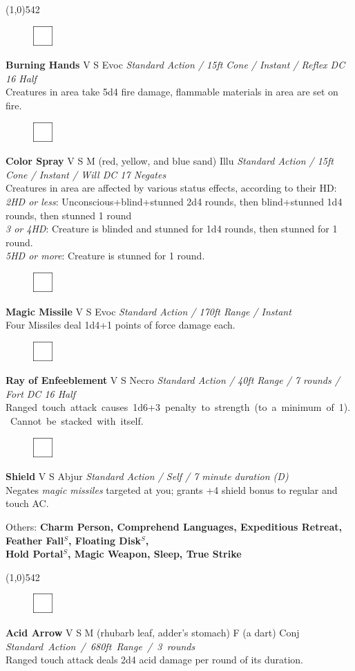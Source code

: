 \documentclass[letterpaper]{article}
\newcommand{\fullline}{\line(1,0){542} \\}
\newcommand{\e}[1]{\emph{#1}}
\newcommand{\B}[1]{\textbf{#1}}
\newcommand{\s}[0]{$^S$}
\newcommand{\spell}[7]{
\begin{figure}
\vspace{-13pt}
\ifstrequal{#2}{Full}{  \includegraphics[width=2em]{Checkbox-Full}}{
\ifstrequal{#2}{Scroll}{\includegraphics[width=2em]{Checkbox-S}}{
                        \includegraphics[width=2em]{Checkbox}}}
\ifstrequal{#7}{}{\vspace{-1em}}{\vspace{#7}}
\end{figure}
 \B{#1} #3 {
    \ifstrequal{#4}{Conj}{\color{Plum}Conj}{%
    \ifstrequal{#4}{Divin}{\color{YellowOrange}Divin}{%
    \ifstrequal{#4}{Ench}{\color{VioletRed}Ench}{%
    \ifstrequal{#4}{Trans}{\color{LimeGreen}Trans}{%
    \ifstrequal{#4}{Evoc}{\color{RedOrange}Evoc}{%
    \ifstrequal{#4}{Illu}{\color{ProcessBlue}Illu}{%
    \ifstrequal{#4}{Abjur}{\color{CadetBlue}Abjur}{%
    \ifstrequal{#4}{Necro}{\color{Red}Necro}{%
}}}}}}}}}
{\footnotesize \e{#5}} \\
#6
}
\begin{document}
\fullline
\vspace{-1.25em}

\spell{Burning Hands}{}{V S}{Evoc}{Standard Action / 15ft Cone / Instant / Reflex DC 16 Half}{%
Creatures in area take 5d4 fire damage, flammable materials in area are set on fire.}{}\\[-1em] %

\spell{Color Spray}{}{V S M (red, yellow, and blue sand)}{Illu}{Standard Action / 15ft Cone / Instant / Will DC 17 Negates}{%
Creatures in area are affected by various status effects, according to their HD:\\
\e{2HD or less}: Unconscious+blind+stunned 2d4 rounds, then blind+stunned 1d4 rounds, then stunned 1 round \\
\e{3 or 4HD}: Creature is blinded and stunned for 1d4 rounds, then stunned for 1 round.\\
\e{5HD or more}: Creature is stunned for 1 round.}{1em}

\spell{Magic Missile}{}{V S}{Evoc}{Standard Action / 170ft Range / Instant}{%
Four Missiles deal 1d4+1 points of force damage each.}{} \\[-1em] %

\spell{Ray of Enfeeblement}{}{V S}{Necro}{Standard Action / 40ft Range / 7 rounds / Fort DC 16 Half}{%
\mbox{Ranged touch attack causes 1d6+3 penalty to strength (to a minimum of 1).  Cannot be stacked with itself.}}{} \\[-1em] %

\spell{Shield}{}{V S}{Abjur}{Standard Action / Self / 7 minute duration (D)}{%
Negates \e{magic missiles} targeted at you; grants +4 shield bonus to regular and touch AC.}{}\\[-1em] %

\begin{adjustwidth}{3em}{0em}
Others: \B{Charm Person, Comprehend Languages, Expeditious Retreat, Feather Fall\s , Floating Disk\s ,\\ Hold Portal\s , Magic Weapon, Sleep, True Strike} \\[-2em]
\end{adjustwidth}

\fullline
\vspace{-1.25em}

\spell{Acid Arrow}{}{V S M (rhubarb leaf, adder's stomach) F (a dart)}{Conj}{\mbox{Standard Action / 680ft Range / 3 rounds}}{%
Ranged touch attack deals 2d4 acid damage per round of its duration.}{}\\[-1em] %
\end{document}
